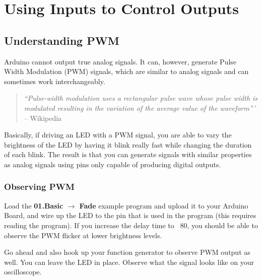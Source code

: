 \documentclass[11pt,a4paper]{article}
\begin{document}



\section{Using Inputs to Control Outputs} %
\label{sec:using_inputs_to_control_outputs}

\subsection{Understanding PWM} %
\label{sub:understanding_pwm}

Arduino cannot output true analog signals.  It can, however, generate Pulse Width Modulation (PWM) signals, which are similar to analog signals and can sometimes work interchangeably.  

\begin{quote}
\emph{``Pulse-width modulation uses a rectangular pulse wave whose pulse width is modulated resulting in the variation of the average value of the waveform'''} -- Wikipedia\cite{pwm}
\end{quote}

Basically, if driving an LED with a PWM signal, you are able to vary the brightness of the LED by having it blink really fast while changing the duration of each blink.  The result is that you can generate signals with similar properties as analog signals using pins only capable of producing digital outputs.

\subsubsection{Observing PWM} %
\label{sub:observing_pwm}

Load the \textbf{01.Basic $\rightarrow$ Fade} example program and upload it to your Arduino Board, and wire up the LED to the pin that is used in the program (this requires reading the program).  If you increase the delay time to ~80, you should be able to observe the PWM flicker at lower brightness levels.  

Go ahead and also hook up your function generator to observe PWM output as well.  You can leave the LED in place.  Observe what the signal looks like on your oscilloscope. 

\end{document}
